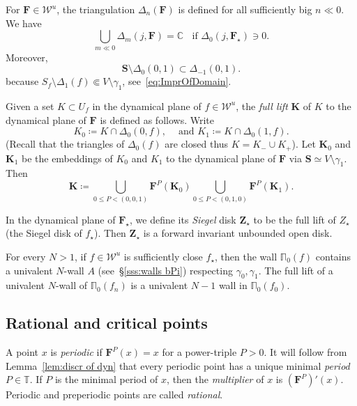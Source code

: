 \documentclass{amsart}
\renewcommand{\sp}{{\ \ }}
\newcommand{\1}{{\mathbb 1 }}
\newcommand\PT{\mathbb{ T}}
\newcommand{\bDelta}{{\mathbb{\Delta}}}
\newcommand{\bPi}{{\mathbb{\Pi}}}
\newcommand{\bF}{{\mathbf F}}
\newcommand{\bZ}{{\mathbf Z}}
\newcommand{\bS}{{\mathbf S}}
\newcommand{\bK}{{\mathbf K}}
\newcommand{\str}{{\star}}
\newcommand\WW{\mathcal{W}}
\newcommand\Unst{{\boldsymbol{\mathcal{W}}^u}}
\newcommand{\C}{\mathbb{C}}
\theoremstyle{remark}
\numberwithin{equation}{section}
\theoremstyle{definition}
\theoremstyle{nonumberbreak}
\begin{document}
 For $\bF\in \Unst$, the triangulation $\bDelta_n(\bF)$ is defined for all sufficiently big $n\ll0$. We have
\begin{equation}
\label{eq:Delta_m appr C}
\bigcup _{m\ll 0}\Delta_m(j,\bF)=\C\sp \sp \text{if }\Delta_0(j,\bF_\str)\ni 0. 
\end{equation}
Moreover,
 \begin{equation}
\label{eq:S in Delta-1}
  \bS\setminus \Delta_0(0,1)\subset \Delta_{-1}(0,1).
 \end{equation}
because $S_f\setminus \bDelta_1(f)\Subset V\setminus \gamma_1$, see~\eqref{eq:ImprOfDomain}. 

Given a set $K\subset U_f$ in the dynamical plane of $f\in \WW^u$, the \emph{full lift} $\bK$ of $K$ to the dynamical plane of $\bF$ is defined as follows. Write \[K_0\coloneqq K\cap \Delta_0(0,f),\sp\sp \text{ and }
K_1\coloneqq K\cap \Delta_0(1,f).\]
(Recall that the triangles of $\bDelta_0(f)$ are closed thus $K=K_-\cup K_+$). Let $\bK_0$ and $\bK_1$ be the embeddings of $K_0$ and $K_1$ to the dynamical plane of $\bF$ via $\bS\simeq V\setminus \gamma_1$. Then
\[\bK\coloneqq  \bigcup_{0\le P<(0,0,1)} \bF^P(\bK_0)\bigcup_{0\le P< (0,1,0)} \bF^P(\bK_1).\]

In the dynamical plane of $\bF_\str$, we define its \emph{Siegel} disk $\bZ_\str$ to be the full lift of $Z_\str$  (the Siegel disk of $f_\str$). Then $\bZ_\str$ is a forward  invariant unbounded open disk.

For every $N>1$, if $f\in \WW^u$ is sufficiently close $f_\str$, then the wall $\bPi_0(f)$ contains a univalent $N$-wall $A$ (see~\S\ref{sss:walls bPi}) respecting $\gamma_0,\gamma_1$. The full lift of a univalent $N$-wall of $\bPi_0(f_n)$ is a univalent $N-1$ wall in $\bPi_0(f_0)$.


 
\subsection{Rational and critical points}
\label{ss:rat crit pts}
A point $x$ is \emph{periodic} if $\bF^P(x)=x$ for a power-triple $P>0$. It will follow from Lemma~\ref{lem:discr of dyn} that every periodic point has a unique minimal \emph{period} $P\in \PT$. If $P$ is the minimal period of $x$, then the \emph{multiplier} of $x$ is $(\bF^P)'(x)$. Periodic and preperiodic points are called \emph{rational}. 
\end{document}
